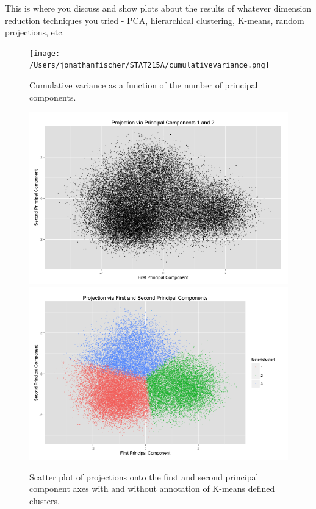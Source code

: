\documentclass[english]{article}\usepackage{graphicx, color}
\numberwithin{equation}{section}
\numberwithin{figure}{section}
\begin{document}
This is where you discuss and show plots about the results of whatever
dimension reduction techniques you tried - PCA, hierarchical clustering,
K-means, random projections, etc.

\begin{figure}
\begin{center}
\texttt{[image: /Users/jonathanfischer/STAT215A/cumulativevariance.png]}
\end{center}
\caption{Cumulative variance as a function of the number of principal components.}
\end{figure}

\begin{figure}
\begin{center}
\includegraphics[scale = .3]{PCA12bw.png}
\includegraphics[scale = .3]{PCA12c.png}
\end{center}
\caption{Scatter plot of projections onto the first and second principal component axes with and without annotation of K-means defined clusters.}
\end{figure}
\end{document}
